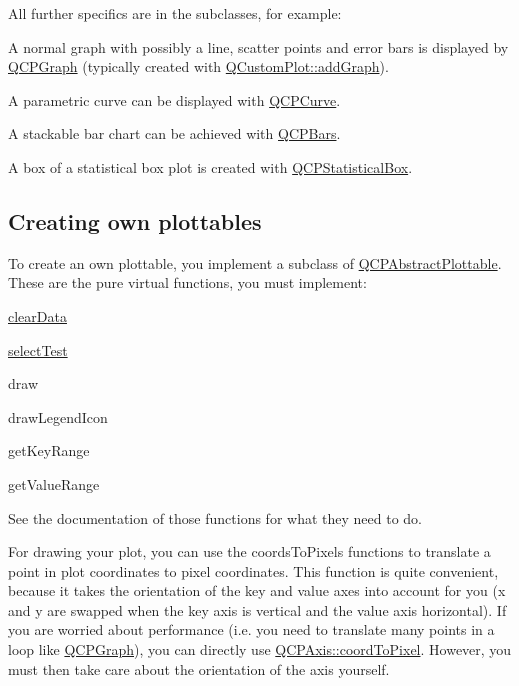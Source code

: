 All further specifics are in the subclasses, for example\-: \begin{DoxyItemize}
\item A normal graph with possibly a line, scatter points and error bars is displayed by \hyperlink{classQCPGraph}{Q\-C\-P\-Graph} (typically created with \hyperlink{classQCustomPlot_a6fb2873d35a8a8089842d81a70a54167}{Q\-Custom\-Plot\-::add\-Graph}). \item A parametric curve can be displayed with \hyperlink{classQCPCurve}{Q\-C\-P\-Curve}. \item A stackable bar chart can be achieved with \hyperlink{classQCPBars}{Q\-C\-P\-Bars}. \item A box of a statistical box plot is created with \hyperlink{classQCPStatisticalBox}{Q\-C\-P\-Statistical\-Box}.\end{DoxyItemize}
\hypertarget{classQCPAbstractPlottable_plottables-subclassing}{}\subsection{Creating own plottables}\label{classQCPAbstractPlottable_plottables-subclassing}
To create an own plottable, you implement a subclass of \hyperlink{classQCPAbstractPlottable}{Q\-C\-P\-Abstract\-Plottable}. These are the pure virtual functions, you must implement\-: \begin{DoxyItemize}
\item \hyperlink{classQCPAbstractPlottable_a86e5b8fd4b6ff4f4084e7ea4c573fc53}{clear\-Data} \item \hyperlink{classQCPAbstractPlottable_a0fd218d6c4974b6ab05bd2f688818556}{select\-Test} \item draw \item draw\-Legend\-Icon \item get\-Key\-Range \item get\-Value\-Range\end{DoxyItemize}
See the documentation of those functions for what they need to do.

For drawing your plot, you can use the coords\-To\-Pixels functions to translate a point in plot coordinates to pixel coordinates. This function is quite convenient, because it takes the orientation of the key and value axes into account for you (x and y are swapped when the key axis is vertical and the value axis horizontal). If you are worried about performance (i.\-e. you need to translate many points in a loop like \hyperlink{classQCPGraph}{Q\-C\-P\-Graph}), you can directly use \hyperlink{classQCPAxis_a985ae693b842fb0422b4390fe36d299a}{Q\-C\-P\-Axis\-::coord\-To\-Pixel}. However, you must then take care about the orientation of the axis yourself.

